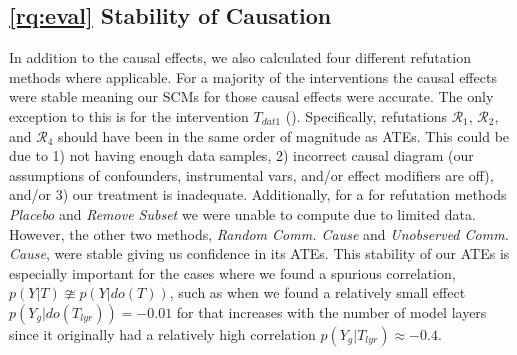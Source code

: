 \subsection{\ref{rq:eval} Stability of Causation}

In addition to the causal effects, we also calculated four different refutation methods where applicable. For a majority of the interventions the causal effects were stable meaning our SCMs for those causal effects were accurate. The only exception to this is for the intervention $T_{dat1}$ (\datainterIII). Specifically, refutations $\mathcal{R}_1$, $\mathcal{R}_2$, and $\mathcal{R}_4$ should have been in the same order of magnitude as ATEs. This could be due to 1) not having enough data samples, 2) incorrect causal diagram (our assumptions of confounders, instrumental vars, and/or effect modifiers are off), and/or 3) our treatment is inadequate. Additionally, for a \datainterII for refutation methods \textit{Placebo} and \textit{Remove Subset} we were unable to compute due to limited data. However, the other two methods, \textit{Random Comm. Cause} and \textit{Unobserved Comm. Cause}, were stable giving us confidence in its ATEs. This stability of our ATEs is especially important for the cases where we found a spurious correlation, \ie $p(Y|T) \ncong p(Y|do(T))$, such as when we found a relatively small effect $p(Y_g|do(T_{lyr}))=-0.01$ for \tf that increases with the number of model layers since it originally had a relatively high correlation $p(Y_g|T_{lyr})\approx-0.4$.


